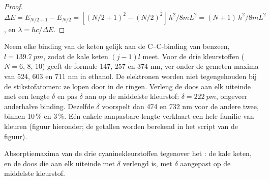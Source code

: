 \begin{proof}
$\Delta E = E_{N/2+1} - E_{N/2} = [(N/2+1)^2 - (N/2)^2]\,h^2/8mL^2 =
(N+1)\,h^2/8mL^2$, en $\lambda = hc/\Delta E$.
\end{proof}

\begin{example}\label{ex:b3:quantum-model-systems:dyes}
Neem elke binding van de keten gelijk aan de C--C-binding van benzeen,
$l = \qty{139.7}{pm}$, zodat de kale keten $(j - 1)l$ meet. Voor de
drie kleurstoffen ($N = 6$, 8, 10) geeft de formule 147, 257 en 374 nm, ver
onder de gemeten maxima van 524, 603 en 711 nm in ethanol. De elektronen
worden niet tegengehouden bij de stikstofatomen: ze lopen door in de
ringen. Verleng de doos aan elk uiteinde met een lengte $\delta$ en pas
$\delta$ aan op de middelste kleurstof:
$\delta = \qty{222}{pm}$, ongeveer anderhalve binding. Dezelfde $\delta$
voorspelt dan 474 en 732 nm voor de andere twee, binnen 10\,\% en 3\,\%. Eén
enkele aanpasbare lengte verklaart een hele familie van kleuren (figuur
hieronder; de getallen worden berekend in het script van de figuur).
\end{example}

\begin{omfigure}

{\small Absorptiemaxima van de drie cyaninekleurstoffen tegenover het
: de kale keten, en de doos die aan elk uiteinde met
$\delta$ verlengd is, met $\delta$ aangepast op de middelste kleurstof.}
\end{omfigure}

